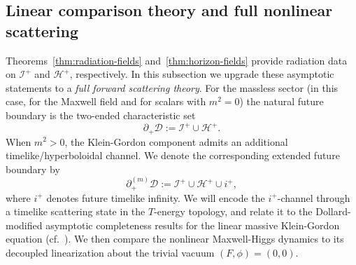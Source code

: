 \documentclass[11pt]{article}
\numberwithin{equation}{section}
\theoremstyle{plain}
\theoremstyle{definition}
\theoremstyle{remark}
\newcommand{\D}{\mathcal{D}}
\begin{document}
\subsection{Linear comparison theory and full nonlinear scattering}\label{subsec:nonlinear-scattering}

Theorems~\ref{thm:radiation-fields} and~\ref{thm:horizon-fields} provide radiation data on $\mathcal I^{+}$ and $\mathcal H^{+}$, respectively.
In this subsection we upgrade these asymptotic statements to a \emph{full forward scattering theory}.
For the massless sector (in this case, for the Maxwell field and for scalars with $m^{2}=0$) the natural future boundary is the two-ended characteristic set
\begin{equation}
\partial_{+}\D := \mathcal I^{+}\cup \mathcal H^{+}.
\end{equation}
When $m^{2}>0$, the Klein-Gordon component admits an additional timelike/hyperboloidal channel.
We denote the corresponding extended future boundary by
\begin{equation}\label{eq:extended-future-boundary}
\partial_{+}^{(m)}\D := \mathcal I^{+}\cup \mathcal H^{+}\cup i^{+},
\end{equation}
where $i^{+}$ denotes future timelike infinity.
We will encode the $i^{+}$-channel through a timelike scattering state in the $T$-energy topology, and relate it to the Dollard-modified asymptotic completeness results for the linear massive Klein-Gordon equation (cf.~\cite{Dimock,BachelotKG}).
We then compare the nonlinear Maxwell-Higgs dynamics to its decoupled linearization about the trivial vacuum $(F,\phi)=(0,0)$.
\end{document}
